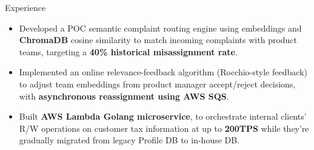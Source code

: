 \documentclass{resume} %
\begin{document}
\begin{workSection}{Experience}
	
	\experienceItem[
		company=Capital One,
		location=New York{,} NY,
		position=Associate Software Engineer,
		duration= February 2026 - present,
	]
	\begin{itemize}
		\vspace{-0.5em}
		\itemsep -6pt {}
		\item Developed a POC semantic complaint routing engine using embeddings and \textbf{ChromaDB} cosine similarity to match incoming complaints with product teams, targeting a \textbf{40\% historical misassignment rate}.
		\item Implemented an online relevance-feedback algorithm (Rocchio-style feedback) to adjust team embeddings from product manager accept/reject decisions, with \textbf{asynchronous reassignment using AWS SQS}.
		\item Built \textbf{AWS Lambda Golang microservice}, to orchestrate internal clients' R/W operations on customer tax information at up to \textbf{200TPS} while they're gradually migrated from legacy Profile DB to in-house DB.

\end{itemize}
\end{workSection}
\end{document}
